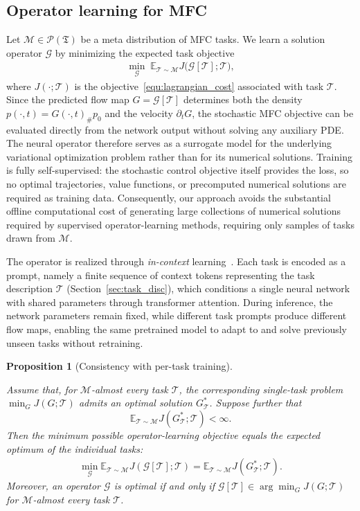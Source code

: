 \documentclass[preprint]{elsarticle}
\newtheorem{proposition}[theorem]{Proposition}
\newcommand{\E}{\mathbb{E}}
\newcommand{\pr}{\mathscr{P}}
\newcommand{\sM}{\mathcal{M}}
\newcommand{\sT}{\mathcal{T}}
\newcommand{\sG}{\mathcal{G}}
\begin{document}
\subsection{Operator learning for MFC}\label{sec:op_mfc}

Let $\sM\in\pr(\mathfrak T)$ be a meta distribution of MFC tasks. We learn a solution operator $\sG$ by minimizing the expected task objective
\begin{align}
\min_{\sG}\;
\E_{\sT\sim\sM}
J\bigl(\sG[\sT];\sT\bigr),
\label{equ:sol_op_obj}
\end{align}
where $J(\cdot;\sT)$ is the objective~\eqref{equ:lagrangian_cost} associated with task $\sT$. Since the predicted flow map \(G=\sG[\sT]\) determines both the density \(p(\cdot,t)=G(\cdot,t)_\#p_0\) and the velocity \(\partial_t G\), the stochastic MFC objective can be evaluated directly from the network output without solving any auxiliary PDE. The neural operator therefore serves as a surrogate model for the underlying variational optimization problem rather than for its numerical solutions. Training is fully self-supervised: the stochastic control objective itself provides the loss, so no optimal trajectories, value functions, or precomputed numerical solutions are required as training data. Consequently, our approach avoids the substantial offline computational cost of generating large collections of numerical solutions required by supervised operator-learning methods, requiring only samples of tasks drawn from \(\sM\).

The operator is realized through \emph{in-context} learning~\cite{xie2022an}. Each task is encoded as a prompt, namely a finite sequence of context tokens representing the task description \(\sT\) (Section~\ref{sec:task_disc}), which conditions a single neural network with shared parameters through transformer attention. During inference, the network parameters remain fixed, while different task prompts produce different flow maps, enabling the same pretrained model to adapt to and solve previously unseen tasks without retraining.


\begin{proposition}[Consistency with per-task training]
\label{prop:consistency}

Assume that, for $\sM$-almost every task $\sT$, the corresponding single-task problem $\min_G J(G;\sT)$ admits an optimal solution $G_\sT^*$. Suppose further that
$$\E_{\sT\sim\sM} J(G_\sT^*;\sT) < \infty.$$
Then the minimum possible operator-learning objective equals the expected optimum of the individual tasks:
\begin{align}
\min_{\sG}
\E_{\sT\sim\sM}
J(\sG[\sT];\sT)
=
\E_{\sT\sim\sM}
J(G_\sT^*;\sT).
\label{equ:consistency}
\end{align}
Moreover, an operator $\sG$ is optimal if and only if $\sG[\sT]\in \arg\min_G J(G;\sT)$ for $\sM$-almost every task $\sT$.
\end{proposition}
\end{document}
